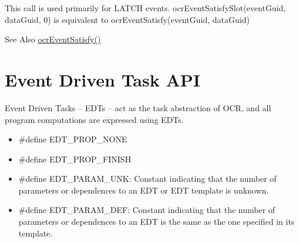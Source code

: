\descr
This call is used primarily for L\-A\-T\-C\-H events. ocr\-Event\-Satisfy\-Slot(event\-Guid, data\-Guid, 0) is
equivalent to ocr\-Event\-Satisfy(event\-Guid, data\-Guid)

\begin{DoxySeeAlso}{See Also}
\hyperlink{group__OCREvents_gab27ef5d905c01ba534e86f8e7e91eaf0}{ocr\-Event\-Satisfy()}
\end{DoxySeeAlso}



\hypertarget{group__OCREDT}{\section{Event Driven Task A\-P\-I}
\label{group__OCREDT}
}

Event Driven Tasks -- E\-D\-Ts -- act as the task abstraction of O\-C\-R, and all
program computations are expressed using E\-D\-Ts.


\begin{itemize}
\item \#define EDT\_PROP\_NONE
\item \#define EDT\_PROP\_FINISH
\item \#define EDT\_PARAM\_UNK: Constant indicating that the number of parameters or dependences to an EDT or EDT template is
unknown.
\item \#define EDT\_PARAM\_DEF: Constant indicating that the number of parameters or dependences to an EDT is the same as the one
specified in its template.
\end{itemize}

